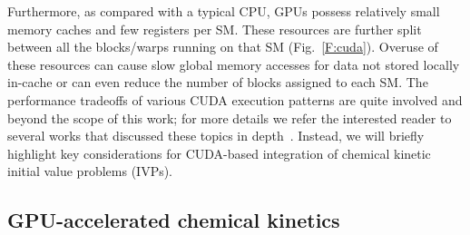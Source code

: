 \documentclass[preprint,review,11pt]{elsarticle}
\begin{document}
Furthermore, as compared with a typical CPU, GPUs possess relatively small memory caches and few registers per SM.
These resources are further split between all the blocks\slash warps running on that SM (Fig.~\ref{F:cuda}).
Overuse of these resources can cause slow global memory accesses for data not stored locally in-cache or can even reduce the number of blocks assigned to each SM.
The performance tradeoffs of various CUDA execution patterns are quite involved and beyond the scope of this work; for more details we refer the interested reader to several works that discussed these topics in depth~\cite{Cruz:2011gc,Brodtkorb:2013hn,Niemeyer:2014hn}.
Instead, we will briefly highlight key considerations for CUDA-based integration of chemical kinetic initial value problems (IVPs).

\subsection{GPU-accelerated chemical kinetics}
\end{document}
